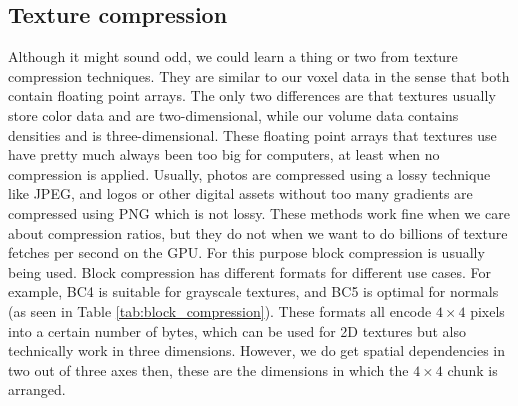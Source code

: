 \subsection{Texture compression} \label{related_work:texture_compression}
Although it might sound odd, we could learn a thing or two from texture compression techniques. They are similar to our voxel data in the sense that both contain floating point arrays. The only two differences are that textures usually store color data and are two-dimensional, while our volume data contains densities and is three-dimensional. These floating point arrays that textures use have pretty much always been too big for computers, at least when no compression is applied. Usually, photos are compressed using a lossy technique like JPEG, and logos or other digital assets without too many gradients are compressed using PNG which is not lossy. These methods work fine when we care about compression ratios, but they do not when we want to do billions of texture fetches per second on the GPU. For this purpose block compression is usually being used\cite{BlockCompression}. Block compression has different formats for different use cases. For example, BC4 is suitable for grayscale textures, and BC5 is optimal for normals (as seen in Table \ref{tab:block_compression}). These formats all encode $4\times 4$ pixels into a certain number of bytes, which can be used for 2D textures but also technically work in three dimensions. However, we do get spatial dependencies in two out of three axes then, these are the dimensions in which the $4\times 4$ chunk is arranged.

